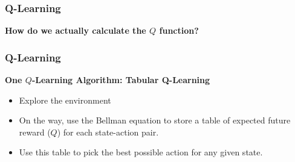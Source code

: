\begin{frame}
\frametitle{Q-Learning}
  \begin{center}
    \textbf{How do we actually calculate the $Q$ function?}
  \end{center}
\end{frame}

\begin{frame}
\frametitle{Q-Learning}
  \textbf{One $Q$-Learning Algorithm: Tabular Q-Learning}
  \begin{itemize}
    \item Explore the environment
    \item On the way, use the Bellman equation to store a table of expected future reward ($Q$) for each state-action pair.
    \item Use this table to pick the best possible action for any given state.
  \end{itemize}
\end{frame}

